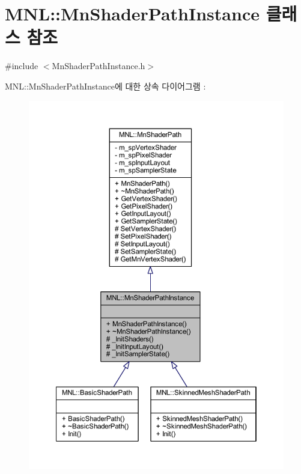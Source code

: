 \hypertarget{class_m_n_l_1_1_mn_shader_path_instance}{}\section{M\+NL\+:\+:Mn\+Shader\+Path\+Instance 클래스 참조}
\label{class_m_n_l_1_1_mn_shader_path_instance}


{\ttfamily \#include $<$Mn\+Shader\+Path\+Instance.\+h$>$}



M\+NL\+:\+:Mn\+Shader\+Path\+Instance에 대한 상속 다이어그램 \+: \nopagebreak
\begin{figure}[H]
\begin{center}
\leavevmode
\includegraphics[width=350pt]{class_m_n_l_1_1_mn_shader_path_instance__inherit__graph}
\end{center}
\end{figure}



